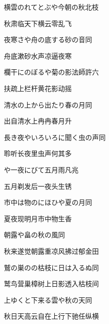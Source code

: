 \begin{haiku}
    {\FH 横雲のれてとぶや今朝の秋}\hfill{\FH 北枝}

    {\FK 秋肃临天下横云零乱飞}
\end{haiku}

\begin{haiku}
    {\FH 夜寒さや舟の底する砂の音}\hfill{\FH 同}

    {\FK 舟底漱砂水声凉逼夜寒}
\end{haiku}

\begin{haiku}
    {\FH 欄干にのぼるや菊の影法師}\hfill{\FH 許六}

    {\FK 扶疏上栏杆黄花影动摇}
\end{haiku}

\begin{haiku}
    {\FH 清水の上から出たり春の月}\hfill{\FH 同}

    {\FK 出自清水上冉冉春月升}
\end{haiku}

\begin{haiku}
    {\FH 長き夜やいろいろに聞く虫の声}\hfill{\FH 同}

    {\FK 聆听长夜里虫声何其多}
\end{haiku}

\begin{haiku}
    {\FH {}や一夜にびて五月雨}\hfill{\FH 凡兆}

    {\FK 五月剃发后一夜头生锈}
\end{haiku}

\begin{haiku}
    {\FH 市中は物のにほひや夏の月}\hfill{\FH 同}

    {\FK 夏夜现明月市中物生香}
\end{haiku}

\begin{haiku}
    {\FH 朝露や畠の秋の風}\hfill{\FH 同}

    {\FK 秋来遂觉朝露重凉风拂过郁金田}
\end{haiku}

\begin{haiku}
    {\FH 鷲の巣のの枯枝に日は入るぬ}\hfill{\FH 同}

    {\FK 鹫鸟营巢樟树上日影透入枯枝间}
\end{haiku}

\begin{haiku}
    {\FH 上ゆくと下来る雲や秋の天}\hfill{\FH 同}

    {\FK 秋日天高云自在上行下驰任纵横}
\end{haiku}


